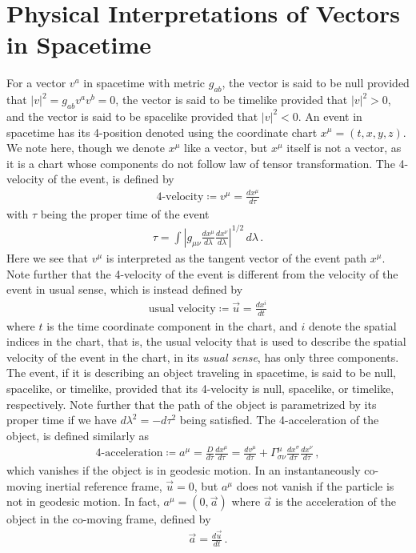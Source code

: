\documentclass[11pt, onesided]{book}
\theoremstyle{break}
\theoremstyle{break}
\begin{document}
\section[Physical Interpretations of Vectors in Spacetime]{\color{red} Physical Interpretations of Vectors in Spacetime\color{black}}
For a vector $v^a$ in spacetime with metric $g_{ab}$, the vector is said to be null provided that $|v|^2 =  g_{ab}v^av^b = 0$, the vector is said to be timelike provided that $|v|^2 >0$, and the vector is said to be spacelike provided that $|v|^2<0$. An event in spacetime has its 4-position denoted using the coordinate chart $x^\mu = (t,x,y,z)$. We note here, though we denote $x^\mu$ like a vector, but $x^\mu$ itself is not a vector, as it is a chart whose components do not follow law of tensor transformation. The 4-velocity of the event, is defined by
\begin{align*}
\text{4-velocity} \coloneqq v^\mu = \frac{dx^\mu}{d\tau}
\end{align*}
with $\tau$ being the proper time of the event
\begin{align*}
\tau  = \int \left|g_{\mu\nu}\frac{dx^\mu}{d\lambda}\frac{dx^\nu}{d\lambda}\right|^{1/2}\, d\lambda\,.
\end{align*}
Here we see that $v^\mu$ is interpreted as the tangent vector of the event path $x^\mu$. Note further that the 4-velocity of the event is different from the velocity of the event in usual sense, which is instead defined by
\begin{align*}
\text{usual velocity}\coloneqq \vec{u} = \frac{dx^i}{dt}
\end{align*} 
where $t$ is the time coordinate component in the chart, and $i$ denote the spatial indices in the chart, that is, the usual velocity that is used to describe the spatial velocity of the event in the chart, in its \textit{usual sense}, has only three components. The event, if it is describing an object traveling in spacetime, is said to be null, spacelike, or timelike, provided that its 4-velocity is null, spacelike, or timelike, respectively. Note further that the path of the object is parametrized by its proper time if we have $d\lambda^2 = -d\tau^2$ being satisfied. The 4-acceleration of the object, is defined similarly as
\begin{align*}
\text{4-acceleration}\coloneqq a^\mu = \frac{D}{d\tau} \frac{dx^\mu}{d\tau} = \frac{dv^\mu}{d\tau} + \Gamma^{\mu}_{\sigma\nu}\frac{dx^\sigma}{d\tau}\frac{dx^\nu}{d\tau} \,,
\end{align*}
which vanishes if the object is in geodesic motion. In an instantaneously co-moving inertial reference frame, $\vec{u} = 0$, but $a^\mu$ does not vanish if the particle is not in geodesic motion. In fact, $a^\mu = (0,\vec{a})$ where $\vec{a}$ is the acceleration of the object in the co-moving frame, defined by 
\begin{align*}
\vec{a} = \frac{d\vec{u}}{dt}\,.
\end{align*}
\end{document}
